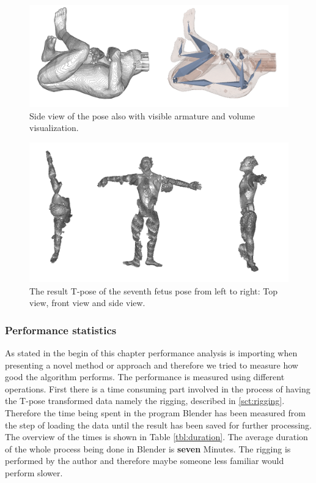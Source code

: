 \begin{figure} [htb!]
    \centering
	\includegraphics[width=15cm]{content/images/results/man7Side.png}
	\caption{Side view of the pose also with visible armature and volume visualization.}
	\label{fig:}
\end{figure}
\vspace{3cm}
\begin{figure} [htb!]
    \centering
	\includegraphics[width=16cm]{content/images/results/man7Results.png}
	\caption{The result T-pose of the seventh fetus pose from left to right: Top view, front view and side view.}
	\label{fig:}
\end{figure}

\clearpage
\subsubsection{Performance statistics}
As stated in the begin of this chapter performance analysis is importing when presenting a novel method or approach and therefore we tried to measure how good the algorithm performs. The performance is measured using different operations. First there is a time consuming part involved in the process of having the T-pose transformed data namely the rigging, described in \ref{sct:rigging}. Therefore the time being spent in the program Blender \cite{Foundation2019Blender} has been measured from the step of loading the data until the result has been saved for further processing. The overview of the times is shown in Table \ref{tbl:duration}. The average duration of the whole process being done in Blender is \textbf{seven} Minutes. The rigging is performed by the author and therefore maybe someone less familiar would perform slower. 

